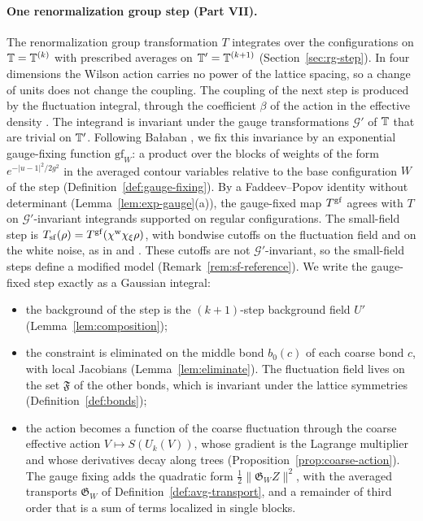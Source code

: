 \paragraph{One renormalization group step (Part VII).} The renormalization group transformation $T$ integrates over the configurations on $\mathbb T=\mathbb T^{(k)}$ with prescribed averages on $\mathbb T'=\mathbb T^{(k+1)}$ (Section~\ref{sec:rg-step}). In four dimensions the Wilson action carries no power of the lattice spacing, so a change of units does not change the coupling. The coupling of the next step is produced by the fluctuation integral, through the coefficient $\beta$ of the action in the effective density \cite[(1.20)--(1.22)]{BalYM4I}. The integrand is invariant under the gauge transformations $\mathcal G'$ of $\mathbb T$ that are trivial on $\mathbb T'$. Following Ba\l aban \cite[(0.14)--(0.19)]{BalYM4I}, we fix this invariance by an exponential gauge-fixing function $\mathrm{gf}_W$: a product over the blocks of weights of the form $e^{-|u-1|^2/2g^2}$ in the averaged contour variables relative to the base configuration $W$ of the step (Definition~\ref{def:gauge-fixing}). By a Faddeev--Popov identity without determinant (Lemma~\ref{lem:exp-gauge}(a)), the gauge-fixed map $T^{\rm gf}$ agrees with $T$ on $\mathcal G'$-invariant integrands supported on regular configurations. The small-field step is $T_{\rm sf}(\rho)=T^{\rm gf}(\chi^{\rm w}\chi_\xi\rho)$, with bondwise cutoffs on the fluctuation field and on the white noise, as in \cite[(2.9), (2.10)]{BalYM4I} and \cite[(206)]{DimockI}. These cutoffs are not $\mathcal G'$-invariant, so the small-field steps define a modified model (Remark~\ref{rem:sf-reference}). We write the gauge-fixed step exactly as a Gaussian integral:
\begin{itemize}
\item the background of the step is the $(k+1)$-step background field $U'$ (Lemma~\ref{lem:composition});
\item the constraint is eliminated on the middle bond $b_0(c)$ of each coarse bond $c$, with local Jacobians (Lemma~\ref{lem:eliminate}). The fluctuation field lives on the set $\mathfrak F$ of the other bonds, which is invariant under the lattice symmetries (Definition~\ref{def:bonds});
\item the action becomes a function of the coarse fluctuation through the coarse effective action $V\mapsto S(U_k(V))$, whose gradient is the Lagrange multiplier and whose derivatives decay along trees (Proposition~\ref{prop:coarse-action}). The gauge fixing adds the quadratic form $\frac12\|\mathfrak G_WZ\|^2$, with the averaged transports $\mathfrak G_W$ of Definition~\ref{def:avg-transport}, and a remainder of third order that is a sum of terms localized in single blocks.
\end{itemize}

